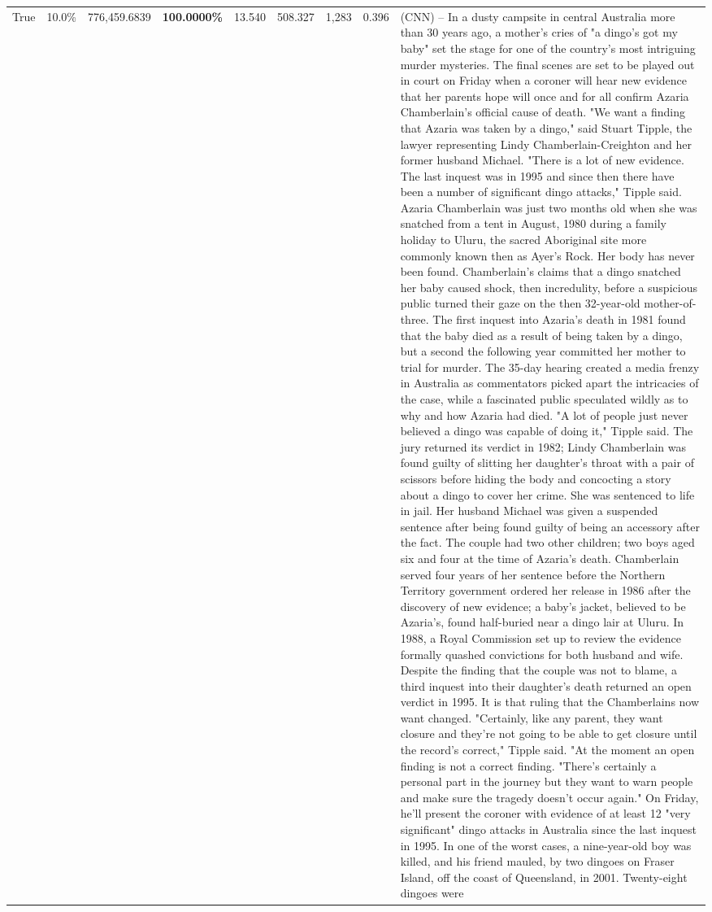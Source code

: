 \begin{table}[H]
\begin{tabular}{lllrlllll}
True & 10.0\% & 776,459.6839 & \bfseries \color{red} 100.0000\% & 13.540 & 508.327 & 1,283 & 0.396 & (CNN) -- In a dusty campsite in central Australia more than 30 years ago, a mother's cries of "a dingo's got my baby" set the stage for one of the country's most intriguing murder mysteries. The final scenes are set to be played out in court on Friday when a coroner will hear new evidence that her parents hope will once and for all confirm Azaria Chamberlain's official cause of death. "We want a finding that Azaria was taken by a dingo," said Stuart Tipple, the lawyer representing Lindy Chamberlain-Creighton and her former husband Michael. "There is a lot of new evidence. The last inquest was in 1995 and since then there have been a number of significant dingo attacks," Tipple said. Azaria Chamberlain was just two months old when she was snatched from a tent in August, 1980 during a family holiday to Uluru, the sacred Aboriginal site more commonly known then as Ayer's Rock. Her body has never been found. Chamberlain's claims that a dingo snatched her baby caused shock, then incredulity, before a suspicious public turned their gaze on the then 32-year-old mother-of-three. The first inquest into Azaria's death in 1981 found that the baby died as a result of being taken by a dingo, but a second the following year committed her mother to trial for murder. The 35-day hearing created a media frenzy in Australia as commentators picked apart the intricacies of the case, while a fascinated public speculated wildly as to why and how Azaria had died. "A lot of people just never believed a dingo was capable of doing it," Tipple said. The jury returned its verdict in 1982; Lindy Chamberlain was found guilty of slitting her daughter's throat with a pair of scissors before hiding the body and concocting a story about a dingo to cover her crime. She was sentenced to life in jail. Her husband Michael was given a suspended sentence after being found guilty of being an accessory after the fact. The couple had two other children; two boys aged six and four at the time of Azaria's death. Chamberlain served four years of her sentence before the Northern Territory government ordered her release in 1986 after the discovery of new evidence; a baby's jacket, believed to be Azaria's, found half-buried near a dingo lair at Uluru. In 1988, a Royal Commission set up to review the evidence formally quashed convictions for both husband and wife. Despite the finding that the couple was not to blame, a third inquest into their daughter's death returned an open verdict in 1995. It is that ruling that the Chamberlains now want changed. "Certainly, like any parent, they want closure and they're not going to be able to get closure until the record's correct," Tipple said. "At the moment an open finding is not a correct finding. "There's certainly a personal part in the journey but they want to warn people and make sure the tragedy doesn't occur again." On Friday, he'll present the coroner with evidence of at least 12 "very significant" dingo attacks in Australia since the last inquest in 1995. In one of the worst cases, a nine-year-old boy was killed, and his friend mauled, by two dingoes on Fraser Island, off the coast of Queensland, in 2001. Twenty-eight dingoes were 
\end{tabular}
\end{table}
